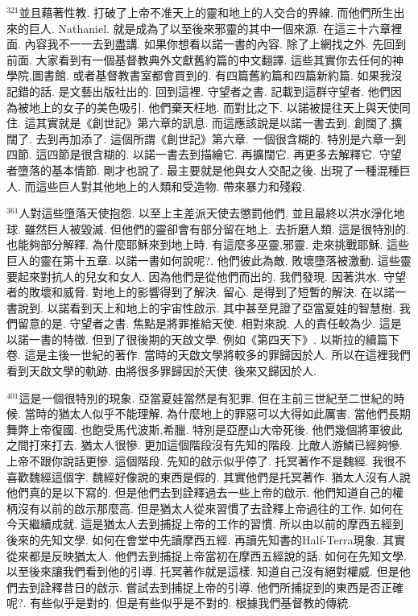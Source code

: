 \documentclass{book}
\begin{document}
$^{321}$並且藉著性教.
打破了上帝不准天上的靈和地上的人交合的界線.
而他們所生出來的巨人.
Nathaniel.
就是成為了以至後來邪靈的其中一個來源.
在這三十六章裡面.
內容我不一一去到盡講.
如果你想看以諾一書的內容.
除了上網找之外.
先回到前面.
大家看到有一個基督教典外文獻舊約篇的中文翻譯.
這些其實你去任何的神學院,圖書館.
或者基督教書室都會買到的.
有四篇舊約篇和四篇新約篇.
如果我沒記錯的話.
是文藝出版社出的.
回到這裡.
守望者之書.
記載到這群守望者.
他們因為被地上的女子的美色吸引.
他們棄天枉地.
而對比之下.
以諾被提往天上與天使同住.
這其實就是《創世記》第六章的訊息.
而這應該說是以諾一書去到.
創闊了,擴闊了.
去到再加添了.
這個所謂《創世記》第六章.
一個很含糊的.
特別是六章一到四節.
這四節是很含糊的.
以諾一書去到描繪它.
再擴闊它.
再更多去解釋它.
守望者墮落的基本情節.
剛才也說了.
最主要就是他與女人交配之後.
出現了一種混種巨人.
而這些巨人對其他地上的人類和受造物.
帶來暴力和殘殺.

$^{361}$人對這些墮落天使抱怨.
以至上主差派天使去懲罰他們.
並且最終以洪水淨化地球.
雖然巨人被毀滅.
但他們的靈卻會有部分留在地上.
去折磨人類.
這是很特別的.
也能夠部分解釋.
為什麼耶穌來到地上時.
有這麼多巫靈,邪靈.
走來挑戰耶穌.
這些巨人的靈在第十五章.
以諾一書如何說呢?.
他們彼此為敵.
敗壞墮落被激動.
這些靈要起來對抗人的兒女和女人.
因為他們是從他們而出的.
我們發現.
因著洪水.
守望者的敗壞和威脅.
對地上的影響得到了解決.
留心.
是得到了短暫的解決.
在以諾一書說到.
以諾看到天上和地上的宇宙性啟示.
其中甚至見證了亞當夏娃的智慧樹.
我們留意的是.
守望者之書.
焦點是將罪推給天使.
相對來說.
人的責任較為少.
這是以諾一書的特徵.
但到了很後期的天啟文學.
例如《第四天下》.
以斯拉的續篇下卷.
這是主後一世紀的著作.
當時的天啟文學將較多的罪歸因於人.
所以在這裡我們看到天啟文學的軌跡.
由將很多罪歸因於天使.
後來又歸因於人.

$^{401}$這是一個很特別的現象.
亞當夏娃當然是有犯罪.
但在主前三世紀至二世紀的時候.
當時的猶太人似乎不能理解.
為什麼地上的罪惡可以大得如此厲害.
當他們長期舞弊上帝復國.
也飽受馬代波斯,希臘.
特別是亞歷山大帝死後.
他們幾個將軍彼此之間打來打去.
猶太人很慘.
更加這個階段沒有先知的階段.
比敵人游鱗已經夠慘.
上帝不跟你說話更慘.
這個階段.
先知的啟示似乎停了.
托冥著作不是魏經.
我很不喜歡魏經這個字.
魏經好像說的東西是假的.
其實他們是托冥著作.
猶太人沒有人說他們真的是以下寫的.
但是他們去到詮釋過去一些上帝的啟示.
他們知道自己的權柄沒有以前的啟示那麼高.
但是猶太人從來習慣了去詮釋上帝過往的工作.
如何在今天繼續成就.
這是猶太人去到捕捉上帝的工作的習慣.
所以由以前的摩西五經到後來的先知文學.
如何在會堂中先讀摩西五經.
再讀先知書的Half-Terra現象.
其實從來都是反映猶太人.
他們去到捕捉上帝當初在摩西五經說的話.
如何在先知文學.
以至後來讓我們看到他的引導.
托冥著作就是這樣.
知道自己沒有絕對權威.
但是他們去到詮釋昔日的啟示.
嘗試去到捕捉上帝的引導.
他們所捕捉到的東西是否正確呢?.
有些似乎是對的.
但是有些似乎是不對的.
根據我們基督教的傳統.
\end{document}

